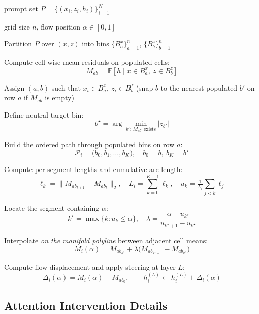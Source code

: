 \documentclass{article}
\begin{document}
\begin{algorithm}[H]
\caption{Manifold-informed Steering (arc-length flow)}
\label{alg:manifold-arclength}
\begin{algorithmic}[1]

 prompt set $P=\{(x_i,z_i,h_i)\}_{i=1}^N$

 grid size $n$, flow position $\alpha\in[0,1]$

\STATE Partition $P$ over $(x,z)$ into bins $\{B_a^x\}_{a=1}^n$, $\{B_b^z\}_{b=1}^n$

\STATE Compute cell-wise mean residuals on populated cells:
\[
M_{ab} = \mathbb{E}[h \mid x \in B_a^x,\ z \in B_b^z]
\]


    \STATE Assign $(a,b)$ such that $x_i \in B_a^x,\ z_i \in B_b^z$
    (snap $b$ to the nearest populated $b'$ on row $a$ if $M_{ab}$ is empty)

    \STATE Define neutral target bin:
    \[
    b^\star = \arg\min_{b':\,M_{ab'}\ \mathrm{exists}} |z_{b'}|
    \]

    \STATE Build the ordered path through populated bins on row $a$:
    \[
    \mathcal{P}_i = \big(b_0, b_1, \dots, b_K\big),\quad b_0 = b,\ b_K = b^\star
    \]

    \STATE Compute per-segment lengths and cumulative arc length:
    \[
    \ell_k = \big\lVert M_{a b_{k+1}} - M_{a b_k} \big\rVert_2,\quad
    L_i = \sum_{k=0}^{K-1} \ell_k,\quad
    u_k = \tfrac{1}{L_i}\sum_{j<k} \ell_j
    \]

    \STATE Locate the segment containing $\alpha$:
    \[
    k^\star = \max\{k : u_k \le \alpha\},\quad
    \lambda = \frac{\alpha - u_{k^\star}}{u_{k^\star+1} - u_{k^\star}}
    \]

    \STATE Interpolate \emph{on the manifold polyline} between adjacent cell means:
    \[
    M_i(\alpha) = M_{a b_{k^\star}} + \lambda \big(M_{a b_{k^\star+1}} - M_{a b_{k^\star}}\big)
    \]

    \STATE Compute flow displacement and apply steering at layer $L$:
    \[
    \Delta_i(\alpha) = M_i(\alpha) - M_{a b_0},\qquad
    h_i^{(L)} \leftarrow h_i^{(L)} + \Delta_i(\alpha)
    \]

\ENDFOR

\end{algorithmic}
\end{algorithm}


\subsection{Attention Intervention Details}
\label{app:attention-details}
\end{document}

